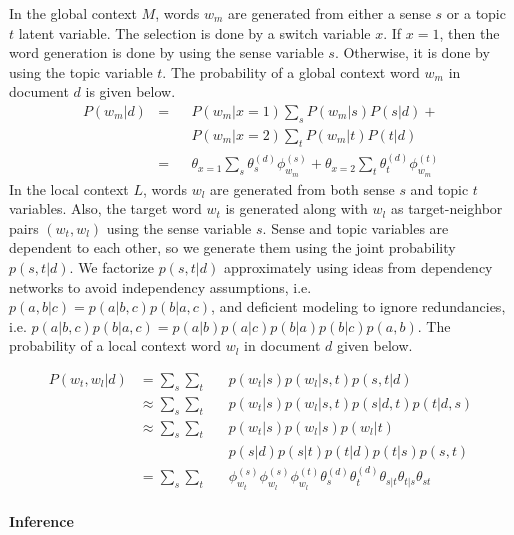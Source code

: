 \documentclass[letterpaper]{article} %
\begin{document}
In the global context $M$, words $w_m$ are generated from either a sense $s$ or a topic $t$ latent variable. The selection is done by a switch variable $x$. If $x=1$, then the word generation is done by using the sense variable $s$. Otherwise, it is done by using the topic variable $t$. The probability of a global context word $w_m$ in document $d$ is given below.
%
\begin{align*}
    P(w_m|d)
    &= &&P(w_m|x=1) \sum_s P(w_m|s) P(s|d) + \\
    & &&P(w_m|x=2) \sum_t P(w_m|t) P(t|d) \\
    &= &&\theta_{x=1} \sum_s \theta^{(d)}_s \phi^{(s)}_{w_m} + \theta_{x=2} \sum_t \theta^{(d)}_t \phi^{(t)}_{w_m} \nonumber
\end{align*}
%
In the local context $L$, words $w_l$ are generated from both sense $s$ and topic $t$ variables. Also, the target word $w_t$ is generated along with $w_l$ as target-neighbor pairs $(w_t,w_l)$ using the sense variable $s$. Sense and topic variables are dependent to each other, so we generate them using the joint probability $p(s,t|d)$. We factorize $p(s,t|d)$ approximately using ideas from dependency networks  \cite{heckerman2000dependency} to avoid independency assumptions, i.e. $p(a,b|c)=p(a|b,c)p(b|a,c)$, and deficient modeling \cite{brown1993mathematics} to ignore redundancies, i.e. $p(a|b,c)p(b|a,c)=p(a|b)p(a|c)p(b|a)p(b|c)p(a,b)$. The probability of a local context word $w_l$ in document $d$ given below.

\begin{align*}
    P(w_t,w_l|d)
    &= \sum_s \sum_t && p(w_t|s) p(w_l|s,t) p(s,t|d) \\
    &\approx \sum_s \sum_t && p(w_t|s) p(w_l|s,t) p(s|d,t) p(t|d,s) \\
    &\approx \sum_s \sum_t && p(w_t|s) p(w_l|s) p(w_l|t) \\ & && p(s|d) p(s|t) p(t|d) p(t|s) p(s,t) \\
    &= \sum_s \sum_t && \phi^{(s)}_{w_t} \phi^{(s)}_{w_l} \phi^{(t)}_{w_l} \theta^{(d)}_s \theta^{(d)}_t \theta_{s|t} \theta_{t|s} \theta_{st} \nonumber
\end{align*}
%
\paragraph{Inference}
\end{document}
